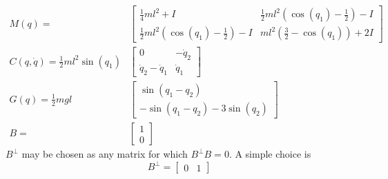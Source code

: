 \begin{align*}
	M(q) = &\begin{bmatrix}
		\tfrac{1}{4}ml^2 + I                         & \tfrac{1}{2}ml^2(\cos(q_1)-\tfrac{1}{2}) - I \\
		\tfrac{1}{2}ml^2(\cos(q_1)-\tfrac{1}{2}) - I & ml^2(\tfrac{3}{2}-\cos(q_1)) + 2I
	\end{bmatrix} \\
	C(q,\dot{q}) = \tfrac{1}{2}ml^2\sin(q_1)&\begin{bmatrix}
		0                   & -\dot{q}_2 \\
		\dot{q}_2-\dot{q}_1 & \dot{q}_1
	\end{bmatrix} \\
	G(q) = \tfrac{1}{2}mgl&\begin{bmatrix}
		\sin(q_1 - q_2) \\
		-\sin(q_1 - q_2) - 3\sin(q_2)
	\end{bmatrix} \\
	B = &\begin{bmatrix}
	1 \\ 0
	\end{bmatrix}
\end{align*}
$B^\perp$ may be chosen as any matrix for which $B^\perp B = 0$. A simple choice is 
\[B^\perp = \begin{bmatrix}
	0 & 1
\end{bmatrix}\]

